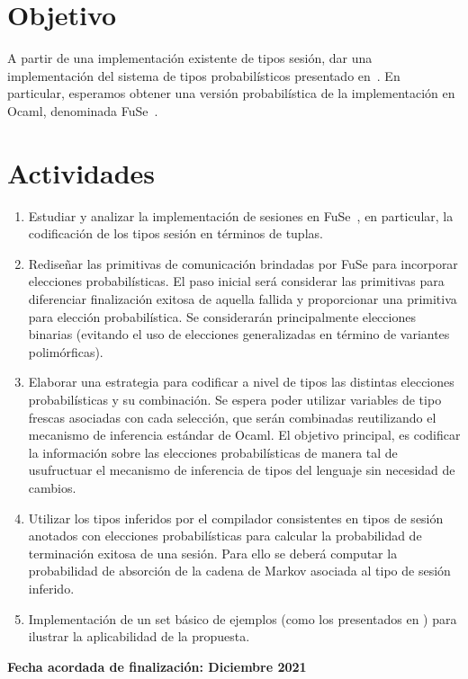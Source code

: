 \documentclass{article}
\begin{document}
\section*{Objetivo}
A partir de una implementaci\'on existente de tipos sesi\'on, dar una implementaci\'on 
del sistema de tipos probabil\'isticos presentado en~\cite{DBLP:conf/concur/InversoMPTT20}.
En particular, esperamos obtener una versi\'on probabil\'istica de la  implementaci\'on en Ocaml, denominada FuSe~\cite{DBLP:journals/jfp/Padovani17}.



\section*{Actividades}
\begin{enumerate}
\item  Estudiar y analizar la implementaci\'on de sesiones en FuSe~\cite{DBLP:journals/jfp/Padovani17}, en particular, la codificaci\'on de los tipos sesi\'on en t\'erminos de tuplas.
\item  Redise\~nar  las primitivas de comunicaci\'on brindadas por FuSe para incorporar elecciones 
probabil\'isticas. El paso inicial ser\'a considerar  las primitivas para diferenciar finalizaci\'on exitosa de aquella fallida y proporcionar una primitiva para elecci\'on probabil\'istica. Se considerar\'an principalmente  elecciones binarias (evitando el uso de elecciones generalizadas en t\'ermino de variantes polim\'orficas). 
\item Elaborar  una estrategia para codificar a nivel de tipos las distintas elecciones probabil\'isticas y su combinaci\'on. Se espera poder utilizar variables de tipo frescas asociadas con cada selecci\'on, que 
ser\'an combinadas reutilizando el mecanismo de inferencia est\'andar de Ocaml. El objetivo principal, es codificar la informaci\'on sobre las elecciones probabil\'isticas de manera tal de usufructuar el mecanismo de inferencia de tipos del lenguaje sin necesidad de cambios.
\item Utilizar los tipos inferidos por el compilador consistentes en tipos de sesi\'on anotados con elecciones probabil\'isticas para calcular la probabilidad de terminaci\'on exitosa de una sesi\'on. Para ello se deber\'a computar la probabilidad de absorci\'on de la cadena de Markov asociada al tipo de sesi\'on inferido.
\item Implementaci\'on de un set b\'asico de ejemplos (como los presentados en \cite{DBLP:journals/jfp/Padovani17}) para ilustrar la aplicabilidad de la propuesta. 
\end{enumerate}

{\bf Fecha acordada de finalizaci\'on:  Diciembre 2021}


\end{document}
